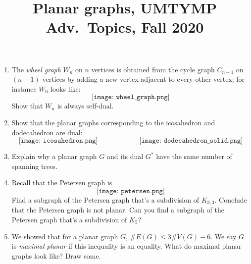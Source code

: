 \documentclass[11pt]{article}
\title{Planar graphs, UMTYMP Adv.~Topics, Fall 2020}
\date{}
\begin{document}
\maketitle

\thispagestyle{empty}

\vspace{-0.6in}

\begin{enumerate}
\item The \emph{wheel graph} $W_n$ on $n$ vertices is obtained from the cycle graph $C_{n-1}$ on $(n-1)$ vertices by adding a new vertex adjacent to every other vertex; for instance $W_6$ looks like:
\[  \texttt{[image: wheel\_graph.png]} \]
Show that $W_n$ is always self-dual.
\item Show that the planar graphs corresponding to the icosahedron and dodecahedron are dual:
\[ \texttt{[image: icosahedron.png]} \qquad \qquad \qquad \texttt{[image: dodecahedron\_solid.png]} \]
\item Explain why a planar graph $G$ and its dual $G^*$ have the same number of spanning trees.
\item Recall that the Petersen graph is
\[ \texttt{[image: petersen.png]} \]
Find a subgraph of the Petersen graph that's a subdivision of $K_{3,3}$. Conclude that the Petersen graph is not planar. Can you find a subgraph of the Petersen graph that's a subdivision of $K_5$?
\item We showed that for a planar graph $G$, $\#E(G) \leq 3\#V(G)-6$. We say $G$ is \emph{maximal planar} if this inequality is an equality. What do maximal planar graphs look like? Draw some.
\end{enumerate}
\end{document}
